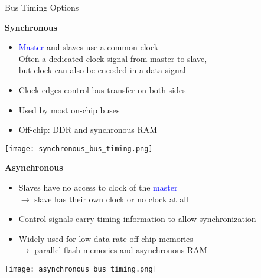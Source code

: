 \begin{theorem}{Bus Timing Options}
    \vspace{2mm}\\
    \begin{minipage}{0.65\linewidth}
    \textbf{Synchronous}
    \begin{itemize}
        \item \textcolor{blue}{Master} and \textcolor{darkcorn}{slaves} use a common clock\\
        Often a dedicated clock signal from master to slave, \\ but clock can also be encoded in a data signal
        \item Clock edges control bus transfer on both sides
        \item Used by most on-chip buses
        \item Off-chip: DDR and synchronous RAM
    \end{itemize}
    \end{minipage}
    \begin{minipage}{0.2\linewidth}
        \vspace{-9mm}
        \texttt{[image: synchronous\_bus\_timing.png]}
    \end{minipage}

    \begin{minipage}{0.65\linewidth}
    \textbf{Asynchronous}
    \begin{itemize}
        \item \textcolor{darkcorn}{Slaves} have no access to clock of the \textcolor{blue}{master}
        \\ $\rightarrow$ slave has their own clock or no clock at all
        \item Control signals carry timing information to allow synchronization
        \item Widely used for low data-rate off-chip memories \\
        $\rightarrow$ parallel flash memories and asynchronous RAM
    \end{itemize}
    \end{minipage}
    \begin{minipage}{0.2\linewidth}
        \vspace{-2mm}
        \texttt{[image: asynchronous\_bus\_timing.png]}
    \end{minipage}
\end{theorem}


